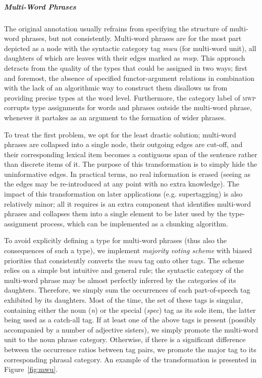 \subparagraph{Multi-Word Phrases}
The original annotation usually refrains from specifying the structure of multi-word phrases, but not consistently.
Multi-word phrases are for the most part depicted as a node with the syntactic category tag \textit{mwu} (for multi-word unit), all daughters of which are leaves with their edges marked as \textit{mwp}.
This approach detracts from the quality of the types that could be assigned in two ways; first and foremost, the absence of specified functor-argument relations in combination with the lack of an algorithmic way to construct them disallows us from providing precise types at the word level.
Furthermore, the category label of \textsc{mwp} corrupts type assignments for words and phrases outside the multi-word phrase, whenever it partakes as an argument to the formation of wider phrases.

To treat the first problem, we opt for the least drastic solution; multi-word phrases are collapsed into a single node, their outgoing edges are cut-off, and their corresponding lexical item becomes a contiguous span of the sentence rather than discrete items of it. 
The purpose of this transformation is to simply hide the uninformative edges.
In practical terms, no real information is erased (seeing as the edges may be re-introduced at any point with no extra knowledge).
The impact of this transformation on later applications (e.g. supertagging) is also relatively minor; all it requires is an extra component that identifies multi-word phrases and collapses them into a single element to be later used by the type-assignment process, which can be implemented as a chunking algorithm.

To avoid explicitly defining a type for multi-word phrases (thus also the consequences of such a type), we implement \textit{majority voting scheme} with biased priorities that consistently converts the \textit{mwu} tag onto other tags.
The scheme relies on a simple but intuitive and general rule; the syntactic category of the multi-word phrase may be almost perfectly inferred by the categories of its daughters. 
Therefore, we simply sum the occurrences of each part-of-speech tag exhibited by its daughters. 
Most of the time, the set of these tags is singular, containing either the noun (\textit{n}) or the special (\textit{spec}) tag as its sole item, the latter being used as a catch-all tag.
If at least one of the above tags is present (possibly accompanied by a number of adjective sisters), we simply promote the multi-word unit to the noun phrase category.
Otherwise, if there is a significant difference between the occurrence ratios between tag pairs, we promote the major tag to its corresponding phrasal category. 
An example of the transformation is presented in Figure~\ref{fig:mwu}.

